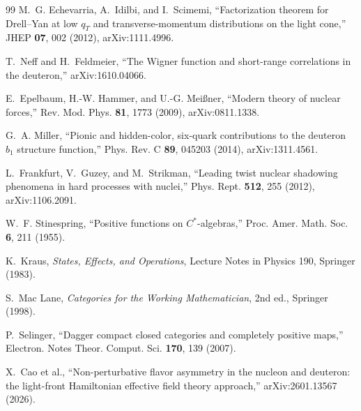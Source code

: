 \documentclass[11pt]{article}
\begin{document}
\begin{thebibliography}{99}
M.~G. Echevarria, A.~Idilbi, and I.~Scimemi,
``Factorization theorem for Drell--Yan at low \(q_T\) and
transverse-momentum distributions on the light cone,''
JHEP \textbf{07}, 002 (2012),
arXiv:1111.4996.

T.~Neff and H.~Feldmeier,
``The Wigner function and short-range correlations in the deuteron,''
arXiv:1610.04066.

E.~Epelbaum, H.-W. Hammer, and U.-G. Mei{\ss}ner,
``Modern theory of nuclear forces,''
Rev. Mod. Phys. \textbf{81}, 1773 (2009),
arXiv:0811.1338.

G.~A. Miller,
``Pionic and hidden-color, six-quark contributions to the deuteron
\(b_1\) structure function,''
Phys. Rev. C \textbf{89}, 045203 (2014),
arXiv:1311.4561.

L.~Frankfurt, V.~Guzey, and M.~Strikman,
``Leading twist nuclear shadowing phenomena in hard processes with nuclei,''
Phys. Rept. \textbf{512}, 255 (2012),
arXiv:1106.2091.

W.~F. Stinespring,
``Positive functions on \(C^*\)-algebras,''
Proc. Amer. Math. Soc. \textbf{6}, 211 (1955).

K.~Kraus,
\emph{States, Effects, and Operations},
Lecture Notes in Physics 190, Springer (1983).

S.~Mac Lane,
\emph{Categories for the Working Mathematician}, 2nd ed.,
Springer (1998).

P.~Selinger,
``Dagger compact closed categories and completely positive maps,''
Electron. Notes Theor. Comput. Sci. \textbf{170}, 139 (2007).

X.~Cao et al.,
``Non-perturbative flavor asymmetry in the nucleon and deuteron: the
light-front Hamiltonian effective field theory approach,''
arXiv:2601.13567 (2026).

\end{thebibliography}
\end{document}
